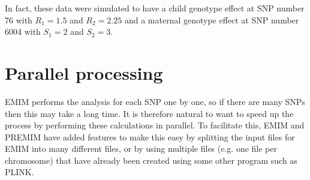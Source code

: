 \documentclass[a4paper,12pt]{article}
\begin{document}


In fact, these data were simulated to have a child genotype effect at SNP number 76 with $R_1 = 1.5$ and $R_2 = 2.25$ and a maternal genotype effect at SNP number 6004 with $S_1 = 2$ and $S_2 = 3$. 




\section{Parallel processing}
\label{parallel}

EMIM performs the analysis for each SNP one by one, so if there are many SNPs then this may take a long time. It is therefore natural to want to speed up the process by performing these calculations in parallel. To facilitate this, EMIM and PREMIM have added features to make this easy by splitting the input files for EMIM into many different files, or by using multiple files (e.g. one file per chromosome) that have already been created using some other program such as PLINK. 
\end{document}
